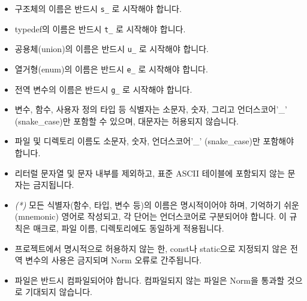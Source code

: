\documentclass{42-ko}
\begin{document}
        \begin{itemize}

            \item 구조체의 이름은 반드시 \texttt{s\_} 로 시작해야 합니다.

            \item typedef의 이름은 반드시 \texttt{t\_} 로 시작해야 합니다.

            \item 공용체(union)의 이름은 반드시 \texttt{u\_} 로 시작해야 합니다.

            \item 열거형(enum)의 이름은 반드시 \texttt{e\_} 로 시작해야 합니다.

            \item 전역 변수의 이름은 반드시 \texttt{g\_} 로 시작해야 합니다.

            \item 변수, 함수, 사용자 정의 타입 등 식별자는 소문자, 숫자, 그리고 
              언더스코어'\_' (snake\_case)만 포함할 수 있으며, 대문자는 
              허용되지 않습니다.

            \item 파일 및 디렉토리 이름도 소문자, 숫자, 언더스코어'\_' (snake\_case)만 
              포함해야 합니다.

            \item 리터럴 문자열 및 문자 내부를 제외하고, 표준 ASCII 테이블에 
              포함되지 않는 문자는 금지됩니다.

            \item \textit{(*)} 모든 식별자(함수, 타입, 변수 등)의 이름은 
              명시적이어야 하며, 기억하기 쉬운(mnemonic) 영어로 작성되고, 
              각 단어는 언더스코어로 구분되어야 합니다. 이 규칙은 매크로, 파일 이름, 
              디렉토리에도 동일하게 적용됩니다.

            \item 프로젝트에서 명시적으로 허용하지 않는 한, const나 static으로 
              지정되지 않은 전역 변수의 사용은 금지되며 Norm 오류로 간주됩니다.

            \item 파일은 반드시 컴파일되어야 합니다. 컴파일되지 않는 파일은 
              Norm을 통과할 것으로 기대되지 않습니다.
        \end{itemize}
\newpage

\end{document}
